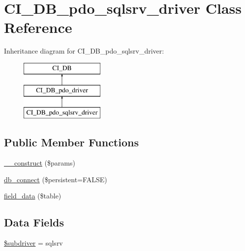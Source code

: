 \hypertarget{class_c_i___d_b__pdo__sqlsrv__driver}{}\section{C\+I\+\_\+\+D\+B\+\_\+pdo\+\_\+sqlsrv\+\_\+driver Class Reference}
\label{class_c_i___d_b__pdo__sqlsrv__driver}
Inheritance diagram for C\+I\+\_\+\+D\+B\+\_\+pdo\+\_\+sqlsrv\+\_\+driver\+:\begin{figure}[H]
\begin{center}
\leavevmode
\includegraphics[height=3.000000cm]{class_c_i___d_b__pdo__sqlsrv__driver}
\end{center}
\end{figure}
\subsection*{Public Member Functions}
\begin{DoxyCompactItemize}
\item 
\mbox{\hyperlink{class_c_i___d_b__pdo__sqlsrv__driver_a9162320adff1a1a4afd7f2372f753a3e}{\+\_\+\+\_\+construct}} (\$params)
\item 
\mbox{\hyperlink{class_c_i___d_b__pdo__sqlsrv__driver_a52bf595e79e96cc0a7c907a9b45aeb4d}{db\+\_\+connect}} (\$persistent=F\+A\+L\+SE)
\item 
\mbox{\hyperlink{class_c_i___d_b__pdo__sqlsrv__driver_a90355121e1ed009e0efdbd544ab56efa}{field\+\_\+data}} (\$table)
\end{DoxyCompactItemize}
\subsection*{Data Fields}
\begin{DoxyCompactItemize}
\item 
\mbox{\hyperlink{class_c_i___d_b__pdo__sqlsrv__driver_a1322ca756348b11d080cb7a4f590de15}{\$subdriver}} = \textquotesingle{}sqlsrv\textquotesingle{}
\end{DoxyCompactItemize}
